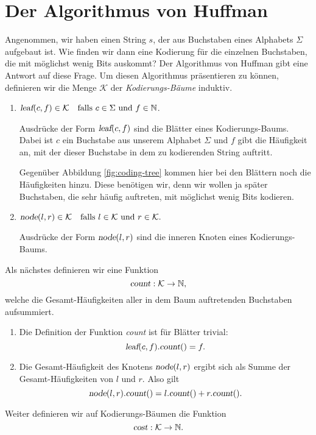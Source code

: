 \section{Der Algorithmus von Huffman}
Angenommen, wir haben einen String $s$, der aus Buchstaben eines Alphabets $\Sigma$
aufgebaut ist.  Wie finden wir dann eine Kodierung f\"ur die einzelnen Buchstaben, die
mit m\"oglichst wenig Bits auskommt?  Der Algorithmus von Huffman gibt eine Antwort auf diese
Frage. Um diesen Algorithmus pr\"asentieren zu k\"onnen, definieren wir die Menge
$\mathcal{K}$ der \emph{Kodierungs-B\"aume} induktiv.  
\begin{enumerate}
\item $\textsl{leaf}(c,f) \in \mathcal{K} \quad \mbox{falls $c \in \Sigma$ und $f \in {\mathbb N}$}$.

      Ausdr\"ucke der Form $\textsl{leaf}(c,f)$ sind die Bl\"atter eines Kodierungs-Baums.
      Dabei ist $c$ ein Buchstabe aus unserem Alphabet $\Sigma$ und $f$ gibt die
      H\"aufigkeit an, mit der dieser Buchstabe in dem zu kodierenden String auftritt.

      Gegen\"uber Abbildung \ref{fig:coding-tree} kommen hier bei den Bl\"attern noch die
      H\"aufigkeiten hinzu.  Diese ben\"otigen wir, denn wir wollen ja sp\"ater Buchstaben,
      die sehr h\"aufig auftreten, mit m\"oglichst wenig Bits kodieren.  

\item $\textsl{node}(l,r) \in \mathcal{K} \quad 
       \mbox{falls $l \in\mathcal{K}$ und $r \in \mathcal{K}$.}$ 

      Ausdr\"ucke der Form $\textsl{node}(l,r)$ sind die inneren Knoten eines
      Kodierungs-Baums.  
\end{enumerate}
Als n\"achstes  definieren wir eine Funktion 
\[  \textsl{count} : \mathcal{K} \rightarrow {\mathbb N}, \]
welche die  Gesamt-H\"aufigkeiten aller in dem Baum auftretenden Buchstaben aufsummiert.
\begin{enumerate}
\item Die Definition der Funktion \textsl{count} ist f\"ur Bl\"atter trivial:
      \[ \textsl{leaf}(c,f).\textsl{count}() = f. \]
\item Die Gesamt-H\"aufigkeit des Knotens $\textsl{node}(l,r)$
      ergibt sich als Summe der Gesamt-H\"aufigkeiten von $l$ und $r$. Also gilt
      \[ \textsl{node}(l,r).\textsl{count}() = l.\textsl{count}() + r.\textsl{count}(). \]
\end{enumerate}
Weiter definieren wir auf Kodierungs-B\"aumen die Funktion
\[ \textsl{cost}: \mathcal{K} \rightarrow {\mathbb N}. \]
